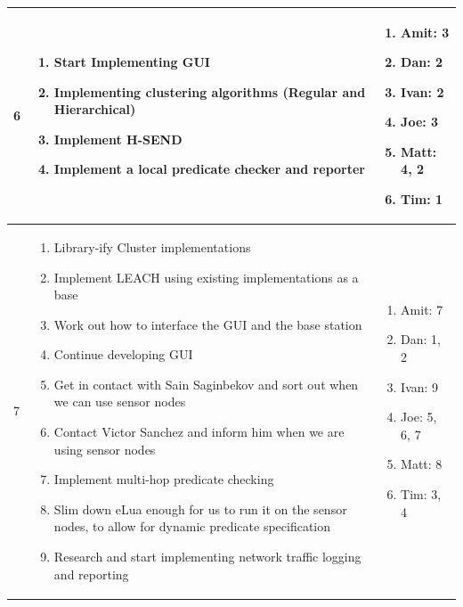 \begin{center}
\begin{longtable}{| l | p{9cm} | p{3.5cm} |}
	
	6 & \begin{enumerate}
			\item Start Implementing GUI
			\item Implementing clustering algorithms (Regular and Hierarchical)
			\item Implement H-SEND
			\item Implement a local predicate checker and reporter
		\end{enumerate} &
	\begin{enumerate}
		\item[] Amit: 3
		\item[] Dan: 2
		\item[] Ivan: 2
		\item[] Joe: 3
		\item[] Matt: 4, 2
		\item[] Tim: 1
	\end{enumerate}
	\\ \hline
	
	7 & \begin{enumerate}
			\item Library-ify Cluster implementations
			\item Implement LEACH  using existing implementations as a base
			\item Work out how to interface the GUI and the base station
			\item Continue developing GUI
			\item Get in contact with Sain Saginbekov and sort out when we can use sensor nodes
			\item Contact Victor Sanchez and inform him when we are using sensor nodes
			\item Implement multi-hop predicate checking
			\item Slim down eLua enough for us to run it on the sensor nodes, to allow for dynamic predicate specification
			\item Research and start implementing network traffic logging and reporting
		\end{enumerate} &
	\begin{enumerate}
		\item[] Amit: 7
		\item[] Dan: 1, 2
		\item[] Ivan: 9
		\item[] Joe: 5, 6, 7
		\item[] Matt: 8
		\item[] Tim: 3, 4
	\end{enumerate}
	\\ \hline
	

\end{longtable}
\end{center}
